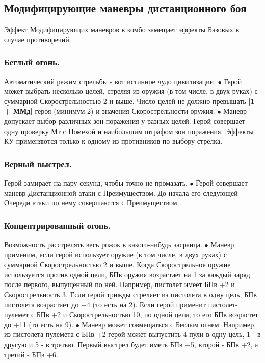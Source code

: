 \subsection{Модифицирующие маневры дистанционного боя}
Эффект Модифицирующих маневров в комбо замещает эффекты Базовых в случае противоречий.

\subsubsection{Беглый огонь.}
\tbd Автоматический режим стрельбы - вот истинное чудо цивилизации.
$\bullet$ Герой может выбрать несколько целей, стреляя из оружия (в том числе, в двух руках) с суммарной Скорострельностью 2 и выше. Число целей не должно превышать \textbf{|1 + ММд|} героя (минимум 2) и значения Скорострельности оружия. 
\newline $\bullet$ Маневр допускает выбор различных зон поражения у разных целей. Герой совершает одну проверку Мт с Помехой и наибольшим штрафом зон поражения. Эффекты КУ применяются только к одному из противников по выбору стрелка.

\subsubsection{Верный выстрел.}
Герой замирает на пару секунд, чтобы точно не промазать.
$\bullet$ Герой совершает маневр Дистанционной атаки с Преимуществом. До начала его следующей Очереди атаки по нему совершаются с Преимуществом. 

\subsubsection{Концентрированный огонь.}
Возможность расстрелять весь рожок в какого-нибудь засранца.
$\bullet$ Маневр применим, если герой использует оружие (в том числе, в двух руках) с суммарной Скорострельностью 2 и выше. Когда Скорострельное оружие используется против одной цели, БПв оружия возрастает на 1 за каждый заряд после первого, выпущенный по ней. 
\newline Например, пистолет имеет БПв +2 и Скорострельность 3. Если герой трижды стреляет из пистолета в одну цель, БПв пистолета возрастает до +4 (то есть на 2). Если герой применит пистолет-пулемет с БПв +2 и Скорострельностью 10, по одной цели, то его БПв возрастет до +11 (то есть на 9).
\newline $\bullet$ Маневр может совмещаться с Беглым огнем. Например, из пистолета-пулемета с БПв +2 герой может выпустить 4 пули в одну цель,  1 - в другую и 5 - в третью. Первый выстрел будет иметь БПв +5, второй - БПв +2, а третий - БПв +6.

